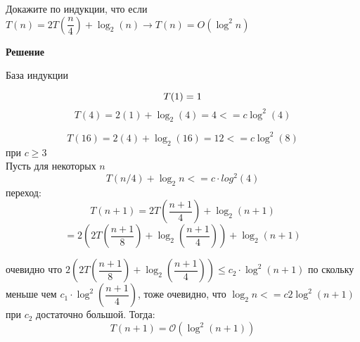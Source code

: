 \documentclass{article}
\begin{document}
Докажите по индукции, что если $T(n) = 2T\left(\dfrac{n}{4} \right) + \log_{2}(n) \longrightarrow T(n) = O(\log^2 n)$

\textbf{Решение}

База индукции

\begin{equation*}
    T(1) = 1\\
\end{equation*}
\begin{equation*}
    T(4) = 2(1) + \log_{2}(4) = 4 <= c\log^2(4)
\end{equation*}

\begin{equation*}
    T(16) = 2(4) + \log_{2}(16) = 12 <= c\log^2(8)
\end{equation*}
при $c \geq 3$\\
Пусть для некоторых $n$
\begin{equation*}
    T(n / 4) + \log_{2}n <= c\cdot log^2(4)
\end{equation*}
переход:
\begin{equation*}
    T(n + 1)=2T\left(\dfrac{n+1}{4}\right) + \log_{2}(n + 1)
\end{equation*}
\begin{equation*}
    = 2\left(2T\left(\dfrac{n+1}{8}\right) + \log_{2}\left(\dfrac{n+1}{4}\right) \right) + \log_{2}(n + 1)
\end{equation*}

очевидно что $2\left(2T\left(\dfrac{n+1}{8}\right) + \log_{2}\left(\dfrac{n+1}{4}\right) \right) \leq c_2 \cdot \log^2 (n + 1)$ по скольку меньше чем $c_1 \cdot \log^2 \left(\dfrac{n + 1}{4}\right)$, тоже очевидно, что $\log_{2} n <= c2 \log^2 (n + 1)$ при $c_2$ достаточно большой. Тогда:
\begin{equation*}
    T(n + 1) = \mathcal{O}(\log^2 (n + 1))
\end{equation*}
\end{document}
